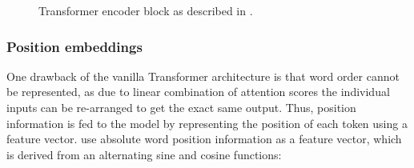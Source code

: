 \documentclass[letterpaper, 12pt]{report}
\begin{document}
\begin{figure}
  \centering
  \caption{Transformer encoder block as described in \citet{vaswani-etal-2017-attention}.}
  \label{fig:bg_transformer}
\end{figure}

\subsubsection{Position embeddings}
\label{sec:bg_position_embeddings}

One drawback of the vanilla Transformer architecture is that word order cannot be represented, as due to linear combination of attention scores the individual inputs can be re-arranged to get the exact same output. Thus, position information is fed to the model by representing the position of each token using a feature vector. \citet{vaswani-etal-2017-attention} use absolute word position information as a feature vector, which is derived from an alternating sine and cosine functions:
\end{document}
